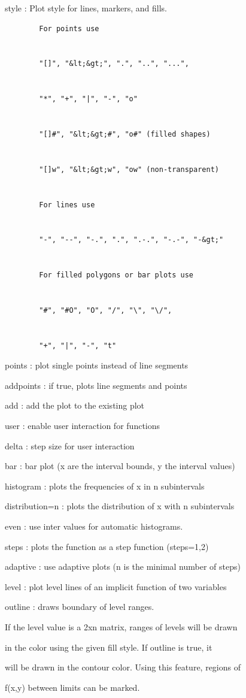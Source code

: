\documentclass[
]{book}
\begin{document}
style : Plot style for lines, markers, and fills.

\begin{verbatim}
        For points use


        "[]", "&lt;&gt;", ".", "..", "...",


        "*", "+", "|", "-", "o"


        "[]#", "&lt;&gt;#", "o#" (filled shapes)


        "[]w", "&lt;&gt;w", "ow" (non-transparent)


        For lines use


        "-", "--", "-.", ".", ".-.", "-.-", "-&gt;"


        For filled polygons or bar plots use


        "#", "#O", "O", "/", "\", "\/",


        "+", "|", "-", "t"
\end{verbatim}

points : plot single points instead of line segments

addpoints : if true, plots line segments and points

add : add the plot to the existing plot

user : enable user interaction for functions

delta : step size for user interaction

bar : bar plot (x are the interval bounds, y the interval values)

histogram : plots the frequencies of x in n subintervals

distribution=n : plots the distribution of x with n subintervals

even : use inter values for automatic histograms.

steps : plots the function as a step function (steps=1,2)

adaptive : use adaptive plots (n is the minimal number of steps)

level : plot level lines of an implicit function of two variables

outline : draws boundary of level ranges.

If the level value is a 2xn matrix, ranges of levels will be drawn

in the color using the given fill style. If outline is true, it

will be drawn in the contour color. Using this feature, regions of

f(x,y) between limits can be marked.
\end{document}
